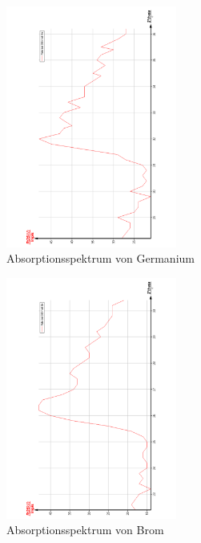 \begin{figure}
  \centering
  \includegraphics[width=0.5\textwidth, angle=270]{bilder/AbsorpGe.pdf}
  \caption{Absorptionsspektrum von Germanium}
  \label{fig:Germanium}
\end{figure}

\begin{figure}
  \centering
  \includegraphics[width=0.5\textwidth, angle=270]{bilder/AbsorpBr.pdf}
  \caption{Absorptionsspektrum von Brom}
  \label{fig:Brom}
\end{figure}

